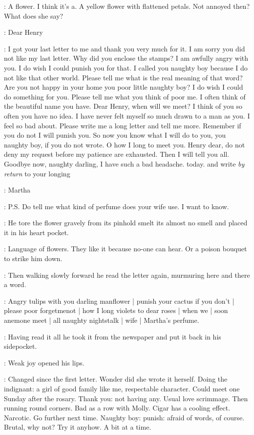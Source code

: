\BloomInt:
A flower.
I think it's a.
A yellow flower with flattened petals.
Not annoyed then?
What does she say?

\martha:
Dear Henry

\martha:
I got your last letter to me and thank you very much for it.
I am sorry you did not like my last letter.
Why did you enclose the stamps?
I am awfully angry with you.
I do wish I could punish you for that.
I called you naughty boy
because I do not like that other world.
Please tell me what is the real meaning of that word?
Are you not happy in your home
you poor little naughty boy?
I do wish I could do something for you.
Please tell me what you think of poor me.
I often think of the beautiful name you have.
Dear Henry,
when will we meet?
I think of you so often
you have no idea.
I have never felt myself so much drawn to a man as you.
I feel so bad about.
Please write me a long letter and tell me more.
Remember if you do not
I will punish you.
So now you know what I will do to you,
you naughty boy, if you do not wrote.
O how I long to meet you.
Henry dear, do not deny my request before my patience are exhausted.
Then I will tell you all.
Goodbye now, naughty darling,
I have such a bad headache.
today.
and write \emph{by return} to your longing

\martha:
Martha

\martha:
P.S. Do tell me what kind of perfume does your wife use.
I want to know.

:
He tore the flower gravely from its pinhold
smelt its almost no smell
and placed it in his heart pocket.

\BloomInt:
Language of flowers.
They like it
because no-one can hear.
Or a poison bouquet to strike him down.

:
Then walking slowly forward
he read the letter again,
murmuring here and there a word.

\BloomInt:
Angry tulips with you darling manflower |
punish your cactus if you don't |
please poor forgetmenot |
how I long violets to dear roses |
when we |
soon anemone meet |
all naughty nightstalk |
wife |
Martha's perfume.

:
Having read it all
he took it from the newspaper and put it back in his sidepocket.

:
Weak joy opened his lips.

\BloomInt:
Changed since the first letter.
Wonder did she wrote it herself.
Doing the indignant:
a girl of good family like me, respectable character.
Could meet one Sunday after the rosary.
Thank you: not having any.
Usual love scrimmage.
Then running round corners.
Bad as a row with Molly.
Cigar has a cooling effect.
Narcotic.
Go further next time.
Naughty boy:
punish:
afraid of words, of course.
Brutal, why not?
Try it anyhow.
A bit at a time.

